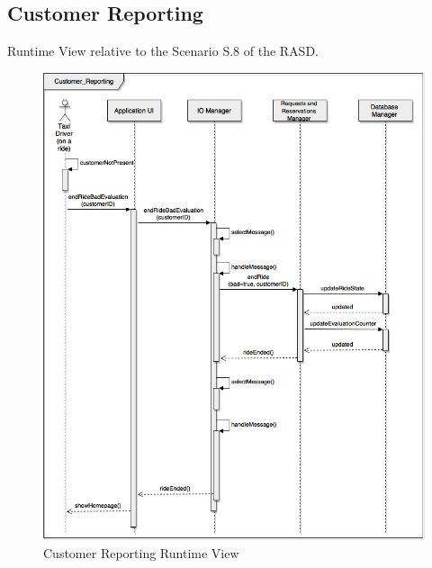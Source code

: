 \documentclass[../../../../../../dd.tex]{subfiles}
\begin{document}
	\subsection{Customer Reporting}
		Runtime View relative to the Scenario S.8 of the RASD.
		\begin{figure}[H]
				\centering
				\includegraphics[width=\textwidth, scale=0.5]{../images/SequenceDiagrams/customerReporting.png}
			\caption{Customer Reporting Runtime View}\label{fig:RuntimeCustomerReporting}
		\end{figure}
		
\end{document}
